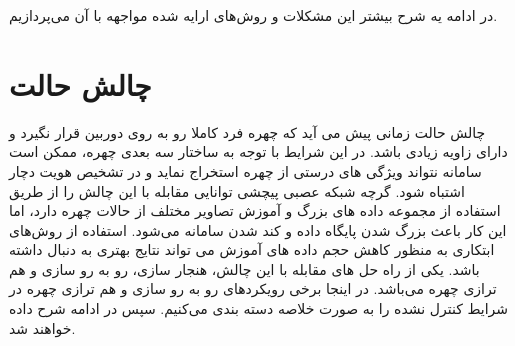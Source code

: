\noindent
در ادامه یه شرح بیشتر این مشکلات و روش‌های ارایه شده مواجهه با آن می‌پردازیم.

\section{چالش حالت}
چالش حالت زمانی پیش می آید که چهره فرد کاملا رو به روی دوربین قرار نگیرد و دارای زاویه زیادی باشد. در این شرایط با توجه به ساختار سه بعدی چهره، ممکن است سامانه نتواند ویژگی های درستی از چهره استخراج نماید و در تشخیص هویت دچار اشتباه شود. گرچه شبکه عصبی پیچشی توانایی مقابله با این چالش را از طریق استفاده از مجموعه داده های بزرگ و آموزش تصاویر مختلف از حالات چهره دارد، اما این کار باعث بزرگ شدن پایگاه داده و کند شدن سامانه می‌شود. استفاده از روش‌های ابتکاری  به منظور کاهش حجم داده های آموزش می تواند نتایج بهتری به دنبال داشته باشد. یکی از راه  حل های مقابله با این چالش، هنجار سازی، رو به رو سازی  و هم ترازی  چهره می‌باشد. در اینجا برخی رویکردهای رو به رو سازی و هم ترازی چهره در شرایط کنترل نشده را به صورت خلاصه دسته بندی می‌کنیم. سپس در ادامه شرح داده خواهند شد. 

